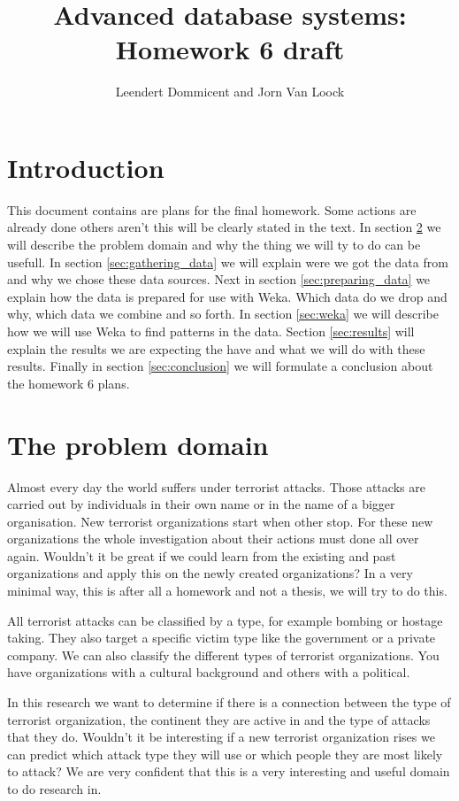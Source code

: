 \documentclass[a4]{article}
\title{Advanced database systems: Homework 6 draft}
\author{Leendert Dommicent and Jorn Van Loock}
\date{}
\begin{document}
\maketitle
\setlength{\parindent}{0px}
\setlength{\parskip}{8px}
\section{Introduction}
This document contains are plans for the final homework. Some actions are already done others aren't this will be clearly stated in the text. In section \ref{sec:problem} we will describe the problem domain and why the thing we will ty to do can be usefull. In section \ref{sec:gathering_data} we will explain were we got the data from and why we chose these data sources. Next in section \ref{sec:preparing_data} we explain how the data is prepared for use with Weka. Which data do we drop and why, which data we combine and so forth. In section \ref{sec:weka} we will describe how we will use Weka to find patterns in the data. Section \ref{sec:results} will explain the results we are expecting the have and what we will do with these results. Finally in section \ref{sec:conclusion} we will formulate a conclusion about the homework 6 plans.
\section{The problem domain}
\label{sec:problem}
Almost every day the world suffers under terrorist attacks. Those attacks are carried out by individuals in their own name or in the name of a bigger organisation. New terrorist organizations start when other stop. For these new organizations the whole investigation about their actions must done all over again. Wouldn't it be great if we could learn from the existing and past organizations and apply this on the newly created organizations? In a very minimal way, this is after all a homework and not a thesis, we will try to do this.\par
All terrorist attacks can be classified by a type, for example bombing or hostage taking. They also target a specific victim type like the government or a private company. We can also classify the different types of terrorist organizations. You have organizations with a cultural background and others with a political.\par
In this research we want to determine if there is a connection between the type of terrorist organization, the continent they are active in and the type of attacks that they do. Wouldn't it be interesting if a new terrorist organization rises we can predict which attack type they will use or which people they are most likely to attack? We are very confident that this is a very interesting and useful domain to do research in.
\end{document}
